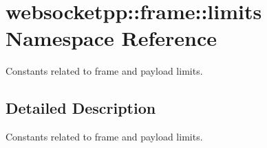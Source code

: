 \hypertarget{namespacewebsocketpp_1_1frame_1_1limits}{}\section{websocketpp\+:\+:frame\+:\+:limits Namespace Reference}
\label{namespacewebsocketpp_1_1frame_1_1limits}


Constants related to frame and payload limits.  




\subsection{Detailed Description}
Constants related to frame and payload limits. 